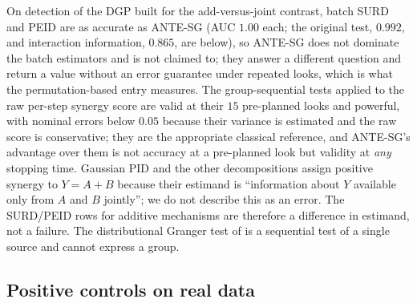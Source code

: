 \documentclass[pdflatex,sn-mathphys-ay]{sn-jnl}%
\theoremstyle{thmstyleone}%
\theoremstyle{thmstyletwo}%
\theoremstyle{thmstylethree}%
\begin{document}
On detection of the DGP built for the add-versus-joint contrast, batch SURD and PEID are as accurate as ANTE-SG (AUC $1.00$ each; the original test, $0.992$, and interaction information, $0.865$, are below), so ANTE-SG does not dominate
the batch estimators and is not claimed to; they answer a different question and return a value without an error guarantee under repeated looks, which is what the permutation-based entry measures. The group-sequential tests
applied to the raw per-step synergy score are valid at their $15$ pre-planned looks and powerful, with nominal errors below $0.05$ because their variance is estimated and the raw score is conservative; they are the appropriate
classical reference, and ANTE-SG's advantage over them is not accuracy at a pre-planned look but validity at \emph{any} stopping time. Gaussian PID and the other decompositions assign positive synergy to
$Y=A+B$ because their estimand is ``information about $Y$ available only from $A$ and $B$ jointly''; we do not describe this as an error. The SURD/PEID rows for additive mechanisms are therefore a difference in estimand,
not a failure. The distributional Granger test of \citet{jha2026} is a sequential test of a single source and cannot express a group.

\subsection{Positive controls on real data}\label{subsec:exp-pv}
\end{document}
